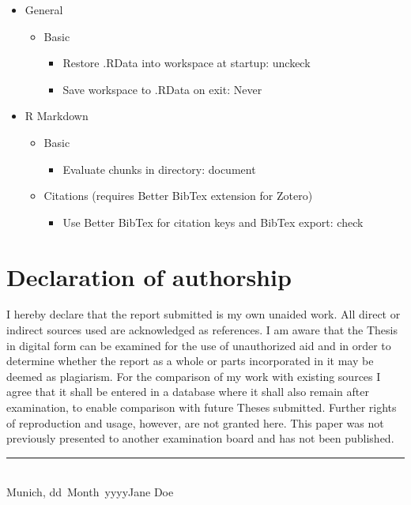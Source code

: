 \documentclass[
]{scrartcl}
\providecommand{\tightlist}{%
  \setlength{\itemsep}{0pt}\setlength{\parskip}{0pt}}
\newcommand{\myname}{Jane Doe}
\newcommand{\dueday}{dd}
\newcommand{\duemonth}{Month}
\newcommand{\dueyear}{yyyy}
\begin{document}
\begin{itemize}
\tightlist
\item
  General

  \begin{itemize}
  \tightlist
  \item
    Basic

    \begin{itemize}
    \tightlist
    \item
      Restore .RData into workspace at startup: unckeck
    \item
      Save workspace to .RData on exit: Never
    \end{itemize}
  \end{itemize}
\item
  R Markdown

  \begin{itemize}
  \tightlist
  \item
    Basic

    \begin{itemize}
    \tightlist
    \item
      Evaluate chunks in directory: document
    \end{itemize}
  \item
    Citations (requires Better BibTex extension for Zotero)

    \begin{itemize}
    \tightlist
    \item
      Use Better BibTex for citation keys and BibTex export: check
    \end{itemize}
  \end{itemize}
\end{itemize}

\newpage

  

\newpage

\section*{Declaration of authorship}
\thispagestyle{empty}
\vspace{-1cm}

\vspace{2cm} I hereby declare that the report submitted is my own unaided work. All direct or indirect sources used
are acknowledged as references. I am aware that the Thesis in digital form can be examined for the use of unauthorized
aid and in order to determine whether the report as a whole or parts incorporated in it may be deemed as plagiarism.
For the comparison of my work with existing sources I agree that it shall be entered in a database where it shall also
remain after examination, to enable comparison with future Theses submitted. Further rights of reproduction and usage,
however, are not granted here. This paper was not previously presented to another examination board and has not been
published.

\vspace{3cm}
\hfill\rule{6cm}{0.4pt}\\
\noindent Munich, \dueday~\duemonth~\dueyear \hfill \myname
\cleardoublepage
\end{document}
